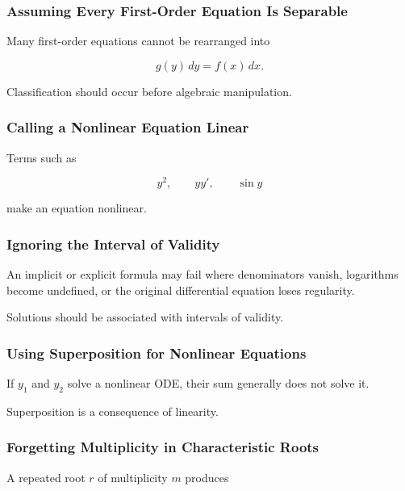 \subsubsection{Assuming Every First-Order Equation Is Separable}

Many first-order equations cannot be rearranged into

\[
g(y)\,dy
=
f(x)\,dx.
\]

Classification should occur before algebraic manipulation.

\subsubsection{Calling a Nonlinear Equation Linear}

Terms such as

\[
y^2,
\qquad
yy',
\qquad
\sin y
\]

make an equation nonlinear.

\subsubsection{Ignoring the Interval of Validity}

An implicit or explicit formula may fail where denominators vanish,
logarithms become undefined, or the original differential equation loses
regularity.

Solutions should be associated with intervals of validity.

\subsubsection{Using Superposition for Nonlinear Equations}

If \(y_1\) and \(y_2\) solve a nonlinear ODE, their sum generally does not
solve it.

Superposition is a consequence of linearity.

\subsubsection{Forgetting Multiplicity in Characteristic Roots}

A repeated root \(r\) of multiplicity \(m\) produces

